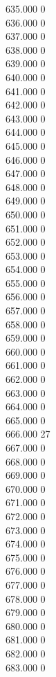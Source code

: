 { 635.000	0 \\
 636.000	0 \\
 637.000	0 \\
 638.000	0 \\
 639.000	0 \\
 640.000	0 \\
 641.000	0 \\
 642.000	0 \\
 643.000	0 \\
 644.000	0 \\
 645.000	0 \\
 646.000	0 \\
 647.000	0 \\
 648.000	0 \\
 649.000	0 \\
 650.000	0 \\
 651.000	0 \\
 652.000	0 \\
 653.000	0 \\
 654.000	0 \\
 655.000	0 \\
 656.000	0 \\
 657.000	0 \\
 658.000	0 \\
 659.000	0 \\
 660.000	0 \\
 661.000	0 \\
 662.000	0 \\
 663.000	0 \\
 664.000	0 \\
 665.000	0 \\
 666.000	27 \\
 667.000	0 \\
 668.000	0 \\
 669.000	0 \\
 670.000	0 \\
 671.000	0 \\
 672.000	0 \\
 673.000	0 \\
 674.000	0 \\
 675.000	0 \\
 676.000	0 \\
 677.000	0 \\
 678.000	0 \\
 679.000	0 \\
 680.000	0 \\
 681.000	0 \\
 682.000	0 \\
 683.000	0 \\
}
